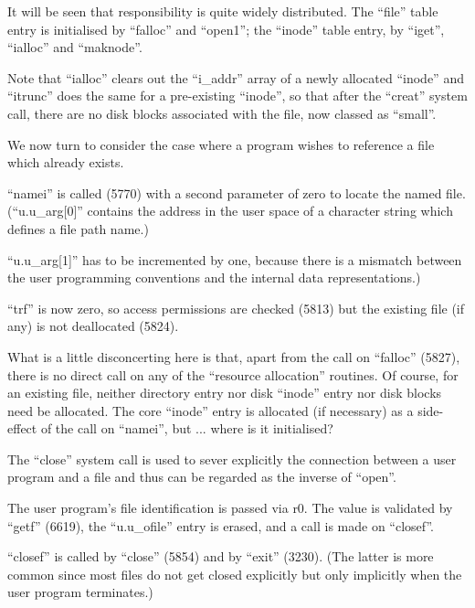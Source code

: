 It will be seen that responsibility is
quite widely distributed. The ``file''
table entry is initialised by ``falloc''
and ``open1''; the ``inode'' table entry,
by ``iget'', ``ialloc'' and ``maknode''.

Note that ``ialloc'' clears out the
``i\_addr'' array of a newly allocated
``inode'' and ``itrunc'' does the same for
a pre-existing ``inode'', so that after
the ``creat'' system call, there are no
disk blocks associated with the file,
now classed as ``small''.



We now turn to consider the case where
a program wishes to reference a file
which already exists.

``namei'' is called (5770) with a second
parameter of zero to locate the named
file. (``u.u\_arg[0]'' contains the
address in the user space of a character string which defines a file path
name.)

``u.u\_arg[1]'' has to be incremented by
one, because there is a mismatch
between the user programming conventions and the internal data representations.)



``trf'' is now zero, so access permissions are checked (5813) but the existing file (if any) is not deallocated
(5824).

What is a little disconcerting here is
that, apart from the call on ``falloc''
(5827), there is no direct call on any
of the ``resource allocation'' routines.
Of course, for an existing file, neither directory entry nor disk ``inode''
entry nor disk blocks need be allocated. The core ``inode'' entry is allocated (if necessary) as a side-effect
of the call on ``namei'', but ... where
is it initialised?



The ``close'' system call is used to
sever explicitly the connection between
a user program and a file and thus can
be regarded as the inverse of ``open''.


The user program's file identification
is passed via r0. The value is validated by
``getf'' (6619), the ``u.u\_ofile''
entry is erased, and a call is made on ``closef''.



``closef'' is called by ``close'' (5854)
and by ``exit'' (3230). (The latter is
more common since most files do not get
closed explicitly but only implicitly
when the user program terminates.)


